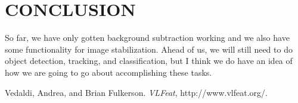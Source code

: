 \documentclass[a4paper, 10pt, conference]{ieeeconf}      %
\begin{document}
\section{CONCLUSION}
So far, we have only gotten background subtraction working and we also have some functionality for image stabilization. Ahead of us, we will still need to do object detection, tracking, and classification, but I think we do have an idea of how we are going to go about accomplishing these tasks. 













\begin{thebibliography}{99}

Vedaldi, Andrea, and Brian Fulkerson. {\it VLFeat}, http://www.vlfeat.org/.



\end{thebibliography}
\end{document}
